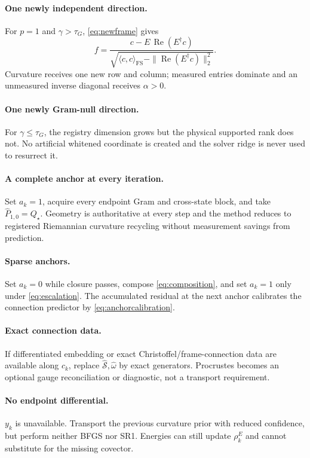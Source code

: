 \documentclass[10pt,twocolumn]{article}
\theoremstyle{definition}
\theoremstyle{remark}
\newcommand{\Rea}{\operatorname{Re}}
\newcommand{\FS}{\mathrm{FS}}
\begin{document}
\paragraph{One newly independent direction.}
For $p=1$ and $\gamma>\tau_G$, \eqref{eq:newframe} gives
\begin{equation}
 f=\frac{c-E\,\Rea(E^\dagger c)}
 {\sqrt{\langle c,c\rangle_{\FS}-\|\Rea(E^\dagger c)\|_2^2}}.
\end{equation}
Curvature receives one new row and column; measured entries dominate and an unmeasured inverse diagonal receives $\alpha>0$.

\paragraph{One newly Gram-null direction.}
For $\gamma\le\tau_G$, the registry dimension grows but the physical supported rank does not.  No artificial whitened coordinate is created and the solver ridge is never used to resurrect it.

\paragraph{A complete anchor at every iteration.}
Set $a_k=1$, acquire every endpoint Gram and cross-state block, and take $\widehat P_{1,0}=Q_\star$.  Geometry is authoritative at every step and the method reduces to registered Riemannian curvature recycling without measurement savings from prediction.

\paragraph{Sparse anchors.}
Set $a_k=0$ while closure passes, compose \eqref{eq:composition}, and set $a_k=1$ only under \eqref{eq:escalation}.  The accumulated residual at the next anchor calibrates the connection predictor by \eqref{eq:anchorcalibration}.

\paragraph{Exact connection data.}
If differentiated embedding or exact Christoffel/frame-connection data are available along $c_k$, replace $\widehat{\mathcal S},\widehat\omega$ by exact generators.  Procrustes becomes an optional gauge reconciliation or diagnostic, not a transport requirement.

\paragraph{No endpoint differential.}
$y_k$ is unavailable.  Transport the previous curvature prior with reduced confidence, but perform neither BFGS nor SR1.  Energies can still update $\rho_k^E$ and cannot substitute for the missing covector.
\end{document}
